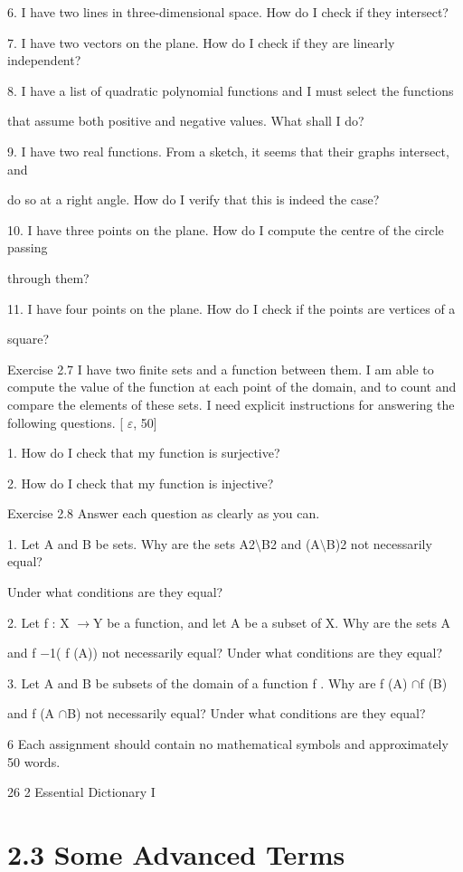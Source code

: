 \documentclass[11pt]{article}
\theoremstyle{plain}
\theoremstyle{definition}
\begin{document}
6. I have two lines in three-dimensional space. How do I check if they intersect?

7. I have two vectors on the plane. How do I check if they are linearly independent?

8. I have a list of quadratic polynomial functions and I must select the functions

that assume both positive and negative values. What shall I do?

9. I have two real functions. From a sketch, it seems that their graphs intersect, and

do so at a right angle. How do I verify that this is indeed the case?

10. I have three points on the plane. How do I compute the centre of the circle passing

through them?

11. I have four points on the plane. How do I check if the points are vertices of a

square?

Exercise 2.7 I have two finite sets and a function between them. I am able to compute the value of the function at each point of the domain, and to count and compare the elements of these sets. I need explicit instructions for answering the following questions. [ $\varepsilon$, 50]

1. How do I check that my function is surjective?

2. How do I check that my function is injective?

Exercise 2.8 Answer each question as clearly as you can.

1. Let A and B be sets. Why are the sets A2$\setminus$B2 and (A$\setminus$B)2 not necessarily equal?

Under what conditions are they equal?

2. Let f : X $\to$Y be a function, and let A be a subset of X. Why are the sets A

and f $-$1( f (A)) not necessarily equal? Under what conditions are they equal?

3. Let A and B be subsets of the domain of a function f . Why are f (A) $\cap$f (B)

and f (A $\cap$B) not necessarily equal? Under what conditions are they equal?

6 Each assignment should contain no mathematical symbols and approximately 50 words.

26 2 Essential Dictionary I

\section{2.3 Some Advanced Terms}
\end{document}
